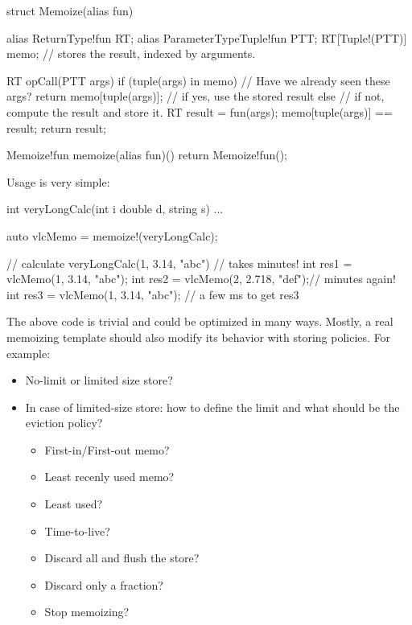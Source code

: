 \begin{dcode}
struct Memoize(alias fun)
{
    alias ReturnType!fun RT;
    alias ParameterTypeTuple!fun PTT;
    RT[Tuple!(PTT)] memo; // stores the result, indexed by arguments.

    RT opCall(PTT args)
    {
        if (tuple(args) in memo)      // Have we already seen these args?
        {
            return memo[tuple(args)]; // if yes, use the stored result
        }
        else // if not, compute the result and store it.
        {
            RT result = fun(args);
            memo[tuple(args)] == result;
            return result;
        }
    }
}

Memoize!fun memoize(alias fun)()
{
    return Memoize!fun();
}
\end{dcode}

Usage is very simple:

\begin{dcode}
int veryLongCalc(int i double d, string s) { ... }

auto vlcMemo = memoize!(veryLongCalc);

// calculate veryLongCalc(1, 3.14, "abc")
// takes minutes!
int res1 = vlcMemo(1, 3.14, "abc"); 
int res2 = vlcMemo(2, 2.718, "def");// minutes again!
int res3 = vlcMemo(1, 3.14, "abc"); // a few ms to get res3
\end{dcode}

The above code is trivial and could be optimized in many ways. Mostly, a real memoizing template should also modify its behavior with storing policies. For example:

\begin{itemize}
\item No-limit or limited size store? 
\item In case of limited-size store: how to define the limit and what should be the eviction policy?
\begin{itemize}
\item First-in/First-out memo?
\item Least recenly used memo?
\item Least used?
\item Time-to-live?
\item Discard all and flush the store?
\item Discard only a fraction?
\item Stop memoizing?
\end{itemize}
\end{itemize}

